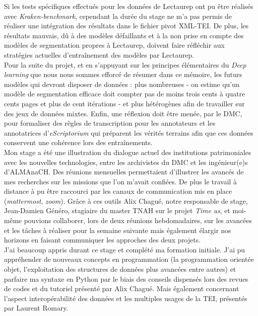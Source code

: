 Si les tests spécifiques effectués pour les données de Lectaurep ont pu être réalisés avec \textit{Kraken-benchmark}, cependant la durée du stage ne m'a pas permis de réaliser une intégration des résultats dans le fichier pivot XML-TEI. De plus, les résultats mauvais, dû à des modèles défaillants et à la non prise en compte des modèles de segmentation propres à Lectaurep, doivent faire réfléchir aux stratégies actuelles d'entraînement des modèles par Lectaurep.\\ 

Pour la suite du projet, et en s'appuyant sur les principes élémentaires du \textit{Deep learning} que nous nous sommes efforcé de résumer dans ce mémoire, les futurs modèles qui devront disposer de données : plus nombreuses - on estime qu'un modèle de segmentation efficace doit compter pas de moins trois cents à quatre cents pages et plus de cent itérations - et plus hétérogènes afin de travailler sur des jeux de données mixtes. Enfin, une réflexion doit être menée, par le DMC, pour formaliser des règles de transcription pour les annotateurs et les annotatrices d'\textit{eScriptorium} qui préparent les vérités terrains afin que ces données conservent une cohérence lors des entraînements.\\

Mon stage a été une illustration du dialogue actuel des institutions patrimoniales avec les nouvelles technologies, entre les archivistes du DMC et les ingénieur(e)s d'ALMAnaCH. Des réunions mensuelles permettaient d'illustrer les avancés de mes recherches sur les missions que l'on m'avait confiées. De plus le travail à distance à pu être raccourci par les canaux de communication mis en place (\textit{mattermost}, \textit{zoom}). Grâce à ces outils Alix Chagué, notre responsable de stage, Jean-Damien Généro, stagiaire du master TNAH sur le projet \textit{Time us}, et moi-même pouvions collaborer, lors de deux réunions hebdomadaires, sur les avancées et les tâches à réaliser pour la semaine suivante mais également élargir nos horizons en faisant communiquer les approches des deux projets.\\

J'ai beaucoup appris durant ce stage et complété ma formation initiale. J'ai pu appréhender de nouveaux concepts en programmation (la programmation orientée objet, l'exploitation des structures de données plus avancées entre autres) et parfaire ma syntaxe en Python par le biais des conseils dispensés lors des revues de codes et du tutoriel présenté par Alix Chagué. Mais également concernant l'aspect interopérabilité des données et les multiples usages de la TEI, présentés par Laurent Romary.\\  

